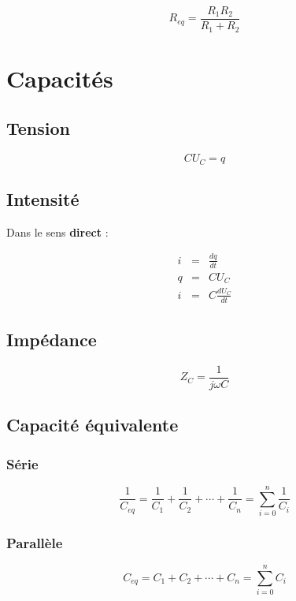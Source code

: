 \documentclass[a4paper, 11pt]{article}
\begin{document}
        $$R_{eq} = \frac{R_1R_2}{R_1+R_2}$$

    \section{Capacités}

        \subsection{Tension}

        $$CU_C=q$$

        \subsection{Intensité}

        Dans le sens {\bf direct} :

        \begin{eqnarray*}
            i & = & \frac{dq}{dt} \\
            q & = & CU_C \\
            i & = & C\frac{dU_C}{dt}
        \end{eqnarray*}

        \subsection{Impédance}

        $$Z_C = \frac{1}{j\omega C}$$

        \subsection{Capacité équivalente}
        
        \subsubsection{Série}

        $$\frac{1}{C_{eq}} = \frac{1}{C_1} + \frac{1}{C_2} + \cdots + \frac{1}{C_n} = \sum_{i=0}^n \frac{1}{C_i}$$

        \subsubsection{Parallèle}

        $$C_{eq} = C_1 + C_2 + \cdots + C_n = \sum_{i=0}^n C_i$$

    
\end{document}
